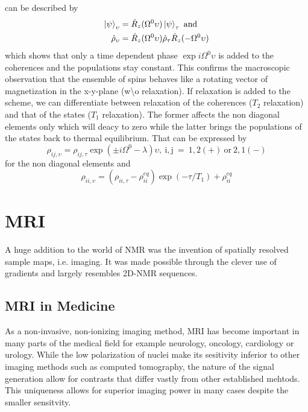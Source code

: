 		can be described by 
		\begin{equation}
			\begin{split}
				\ket\psi_\upsilon &= \hat R_z(\Omega^0\upsilon)\ket\psi_\tau ~ \mathrm{and} \\
				\hat\rho_\upsilon &= \hat R_z(\Omega^0\upsilon)\hat\rho_\tau\hat
				R_z(-\Omega^0\upsilon)
			\end{split}
		\end{equation}
		which shows that only a time dependent phase $\exp{i\Omega^0 \upsilon}$ is added to the coherences and the populations
		stay constant. This confirms the macroscopic observation that the ensemble of spins behaves like a rotating vector of
		magnetization in the x-y-plane (w\textbackslash o relaxation).
		If relaxation is added to the scheme, we can differentiate between relaxation of the
		coherences ($T_2$ relaxation) and that of the states ($T_1$ relaxation). The former affects
		the non diagonal elements only which will deacy to zero while the latter brings the populations of the states back to
		thermal equilibrium. That can be expressed by
		\begin{equation}
			\rho_{ij, \upsilon} = \rho_{ij, \tau} \exp{(\pm
				i\Omega^0-\lambda)\upsilon},~\mathrm{i,j~=~
			1,2(+)~or~2,1(-)}
		\end{equation}
		for the non diagonal elements and
		\begin{equation}
			\rho_{ii,\upsilon} = (\rho_{ii,\tau} - \rho_{ii}^{eq})\exp(-\tau/T_1)+\rho_{ii}^{eq}
		\end{equation}

	\section{MRI}
		A huge addition to the world of NMR was the invention of spatially resolved sample maps,
		i.e. imaging. It was made possible through the clever use of gradients and largely resembles
		2D-NMR sequences.
		\subsection{MRI in Medicine}
			As a non-invasive, non-ionizing imaging method, MRI has become important in many parts
			of the medical field for example neurology, oncology, cardiology or urology. While the
			low polarization of nuclei make its sesitivity inferior to other imaging methods such as
			computed tomography, the nature of the signal generation allow for contrasts that differ
			vastly from other established mehtods. This uniqueness allows for superior imaging power
			in many cases despite the smaller sensitvity.
